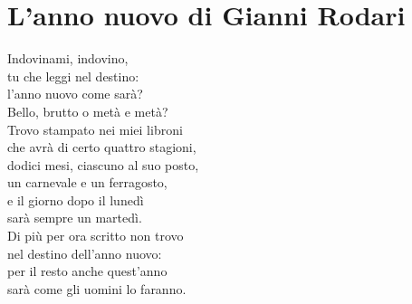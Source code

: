 \documentclass[letter,11pt]{article}
\begin{document}
\vskip 0.2in
\section*{L'anno nuovo di Gianni Rodari}
\vskip 0.2in

\begin{multicols}{2}
\noindent Indovinami, indovino, \\
tu che leggi nel destino: \\
l’anno nuovo come sarà? \\
Bello, brutto o metà e metà? \\
Trovo stampato nei miei libroni  \\
che avrà di certo quattro stagioni, \\
dodici mesi, ciascuno al suo posto, \\
un carnevale e un ferragosto, \\
e il giorno dopo il lunedì \\
sarà sempre un martedì. \\
Di più per ora scritto non trovo \\
nel destino dell’anno nuovo: \\
per il resto anche quest’anno \\
sarà come gli uomini lo faranno. \\

\end{multicols}
\end{document}
